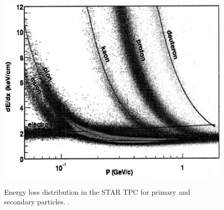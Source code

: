 \begin{figure}[h]
  \centering
  \includegraphics[width=5.5in]{../figures/0034-4885-73-11-116201_star_PID.jpg}\\
  \caption{Energy loss distribution in the STAR TPC for primary and secondary particles. \cite{0034-4885-73-11-116201}.}\label{fig:STAR_PID}
\end{figure}


